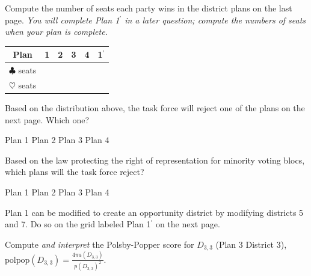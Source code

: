 \documentclass[12pt,addpoints]{exam}
\begin{document}
	\begin{questions}\setcounter{question}{10}
					
		\begin{minipage}{.5\textwidth}
					\question[5] 
						Compute the number of seats each party wins in the district plans on the last page. \emph{You will complete Plan 1$^\prime$ in a later question; compute the numbers of seats when your plan is complete.}
		\end{minipage}\hfill
		\begin{minipage}{.4\textwidth}
				{
					\renewcommand{\arraystretch}{1.5}
					\begin{tabular}{|c|c|c|c|c|c|}
						\hline
						Plan & 1 & 2 & 3 & 4 & 1$^\prime$ \\
						\hline
						$\clubsuit$ seats & \phantom{100} & \phantom{100} &  \phantom{100} & \phantom{100}& \phantom{100} \\
						\hline
						$\heartsuit$ seats & & & & & \\
						\hline
					\end{tabular}
				}
		\end{minipage}

		\question[1] 
			Based on the distribution above, the task force will reject one of the plans on the next page. Which one?
			\begin{oneparcheckboxes}
				\choice Plan 1 \choice Plan 2 \choice Plan 3 \choice Plan 4
			\end{oneparcheckboxes}

		\question[1] 
			Based on the law protecting the right of representation for minority voting blocs, which plans will the task force reject?
			\begin{oneparcheckboxes}
				\choice Plan 1 \choice Plan 2 \choice Plan 3 \choice Plan 4
			\end{oneparcheckboxes}

		\question[3] Plan 1 can be modified to create an opportunity district by modifying districts 5 and 7. Do so on the grid labeled Plan 1$^\prime$ on the next page.

\clearpage

	
		\question[5] 
			Compute \textit{and interpret} the Polsby-Popper score for $D_{3,3}$ (Plan 3 District 3),\\[.5em]
			\(\displaystyle \mathrm{polpop}(D_{3,3}) = \frac{4\pi a(D_{3,3})}{p(D_{3,3})^2}.\)
			\vfill


\end{questions}
\end{document}
